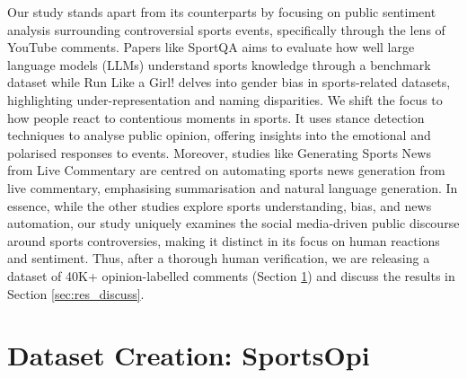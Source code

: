 \documentclass[sigconf, review]{acmart}
\begin{document}
Our study stands apart from its counterparts by focusing on public sentiment analysis surrounding controversial sports events, specifically through the lens of YouTube comments. Papers like SportQA \cite{xia-etal-2024-sportqa} aims to evaluate how well large language models (LLMs) understand sports knowledge through a benchmark dataset while Run Like a Girl! \cite{harrison-etal-2023-run} delves into gender bias in sports-related datasets, highlighting under-representation and naming disparities. We shift the focus to how people react to contentious moments in sports. It uses stance detection techniques to analyse public opinion, offering insights into the emotional and polarised responses to events. Moreover, studies like Generating Sports News from Live Commentary \cite{huang-etal-2020-generating} are centred on automating sports news generation from live commentary, emphasising summarisation and natural language generation. In essence, while the other studies explore sports understanding, bias, and news automation, our study uniquely examines the social media-driven public discourse around sports controversies, making it distinct in its focus on human reactions and sentiment. Thus, after a thorough human verification, we are releasing a dataset of 40K+ opinion-labelled comments (Section \ref{sec:dataset}) and discuss the results in Section \ref{sec:res_discuss}. 




\section{Dataset Creation: SportsOpi}\label{sec:dataset}
\end{document}
